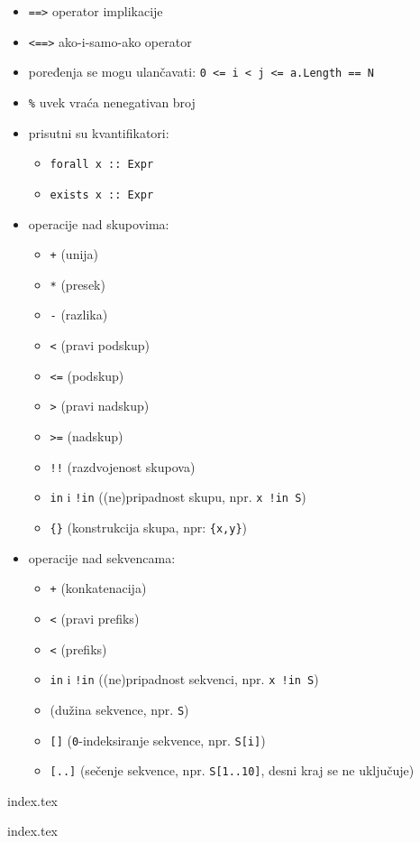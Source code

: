 \begin{itemize}
\tightlist
\item
  \texttt{==\textgreater{}} operator implikacije
\item
  \texttt{\textless{}==\textgreater{}} ako-i-samo-ako operator
\item
  poređenja se mogu ulančavati: \texttt{0\ \textless{}=\ i\ \textless{}\ j\ \textless{}=\ a.Length\ ==\ N}
\item
  \texttt{\%} uvek vraća nenegativan broj
\item
  prisutni su kvantifikatori:

  \begin{itemize}
  \tightlist
  \item
    \texttt{forall\ x\ ::\ Expr}
  \item
    \texttt{exists\ x\ ::\ Expr}
  \end{itemize}
\item
  operacije nad skupovima:

  \begin{itemize}
  \tightlist
  \item
    \texttt{+} (unija)
  \item
    \texttt{*} (presek)
  \item
    \texttt{-} (razlika)
  \item
    \texttt{\textless{}} (pravi podskup)
  \item
    \texttt{\textless{}=} (podskup)
  \item
    \texttt{\textgreater{}} (pravi nadskup)
  \item
    \texttt{\textgreater{}=} (nadskup)
  \item
    \texttt{!!} (razdvojenost skupova)
  \item
    \texttt{in} i \texttt{!in} ((ne)pripadnost skupu, npr. \texttt{x\ !in\ S})
  \item
    \texttt{\{\}} (konstrukcija skupa, npr: \texttt{\{x,y\}})
  \end{itemize}
\item
  operacije nad sekvencama:

  \begin{itemize}
  \tightlist
  \item
    \texttt{+} (konkatenacija)
  \item
    \texttt{\textless{}} (pravi prefiks)
  \item
    \texttt{\textless{}} (prefiks)
  \item
    \texttt{in} i \texttt{!in} ((ne)pripadnost sekvenci, npr. \texttt{x\ !in\ S})
  \item
    \texttt{\textbar{}\textbar{}} (dužina sekvence, npr. \texttt{\textbar{}S\textbar{}})
  \item
    \texttt{{[}{]}} (\texttt{0}-indeksiranje sekvence, npr. \texttt{S{[}i{]}})
  \item
    \texttt{{[}..{]}} (sečenje sekvence, npr. \texttt{S{[}1..10{]}}, desni kraj se ne uključuje)
  \end{itemize}
\end{itemize}

{index.tex}

{index.tex}
